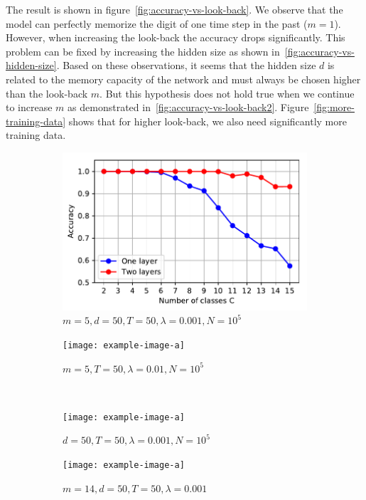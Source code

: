		The result is shown in figure~\ref{fig:accuracy-vs-look-back}. 
		We observe that the model can perfectly memorize the digit of one time step in the past ($m = 1$).
		However, when increasing the look-back the accuracy drops significantly.
		This problem can be fixed by increasing the hidden size as shown in~\ref{fig:accuracy-vs-hidden-size}.
		Based on these observations, it seems that the hidden size $d$ is related to the memory capacity of the network and must always be chosen higher than the look-back $m$. 
		But this hypothesis does not hold true when we continue to increase $m$ as demonstrated in~\ref{fig:accuracy-vs-look-back2}.
		Figure~\ref{fig:more-training-data} shows that for higher look-back, we also need significantly more training data. 
		
		
		\begin{figure}[tb]
			\centering
			\begin{subfigure}[b]{0.5\linewidth}
				\centering
				\includegraphics[width=\linewidth]{Images/Python-Plots/memory/accuracy-vs-multiple-classes-and-layers}
				\caption{
					$m = 5, d = 50, T = 50, \lambda = 0.001, N = 10^5$
					\label{fig:accuracy-vs-multiple-classes-and-layers}
				}
			\end{subfigure}%
			\begin{subfigure}[b]{0.5\linewidth}
				\texttt{[image: example-image-a]}
				\caption{
					$m = 5, T = 50, \lambda = 0.01, N = 10^5$
					\label{}
				}
			\end{subfigure}
			\\
			\begin{subfigure}[b]{0.5\linewidth}
				\texttt{[image: example-image-a]}
				\caption{
					$d = 50, T = 50, \lambda = 0.001, N = 10^5$
					\label{}
				}
			\end{subfigure}%
			\begin{subfigure}[b]{0.5\linewidth}
				\texttt{[image: example-image-a]}
				\caption{
					$m = 14, d = 50, T = 50, \lambda = 0.001$
					\label{}
				}
			\end{subfigure}
			\caption[Memorizing the past with the LSTM: Multiple classes]
			{}
			\label{fig:ablation-study-multiclass-memory}
		\end{figure}
		
		
		
		
		